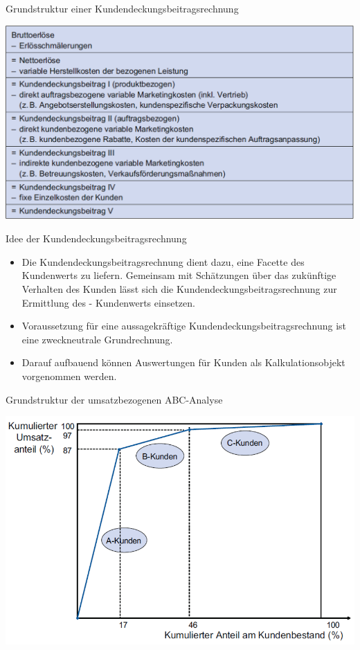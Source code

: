 \documentclass[12pt,ngerman,a4paper,ignorenonframetext,]{beamer}
\providecommand{\tightlist}{%
  \setlength{\itemsep}{0pt}\setlength{\parskip}{0pt}}
\begin{document}
\begin{frame}{Grundstruktur einer Kundendeckungsbeitragsrechnung}
\protect\hypertarget{grundstruktur-einer-kundendeckungsbeitragsrechnung}{}

\begin{center}\includegraphics[width=0.7\linewidth]{./images/Marketingcontrolling/Kundendeckungsbeitragsrechnung} \end{center}

\end{frame}

\begin{frame}{Idee der Kundendeckungsbeitragsrechnung}
\protect\hypertarget{idee-der-kundendeckungsbeitragsrechnung}{}

\begin{itemize}
\tightlist
\item
  Die Kundendeckungsbeitragsrechnung dient dazu, eine Facette des
  Kundenwerts zu liefern. Gemeinsam mit Schätzungen über das zukünftige
  Verhalten des Kunden lässt sich die Kundendeckungsbeitragsrechnung zur
  Ermittlung des - Kundenwerts einsetzen.
\item
  Voraussetzung für eine aussagekräftige Kundendeckungsbeitragsrechnung
  ist eine zweckneutrale Grundrechnung.
\item
  Darauf aufbauend können Auswertungen für Kunden als Kalkulationsobjekt
  vorgenommen werden.
\end{itemize}

\end{frame}

\begin{frame}{Grundstruktur der umsatzbezogenen ABC-Analyse}
\protect\hypertarget{grundstruktur-der-umsatzbezogenen-abc-analyse}{}

\begin{center}\includegraphics[width=0.48\linewidth]{./images/Marketingcontrolling/ABC} \end{center}

\end{frame}
\end{document}
